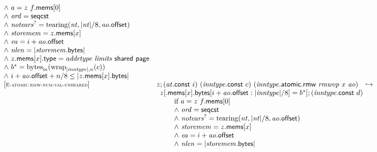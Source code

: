$$\begin{array}[t]{@{}lrcl@{}l@{}}
{\begin{array}[t]{@{}l@{}}
{\land}~ a = z~f{.}\mathsf{mems}{}[0] \\
{\land}~ {\mathit{ord}} = \mathsf{seqcst} \\
{\land}~ {{\mathit{notears}}^?} = {\mathrm{tearing}}({\mathit{nt}}, {|{\mathit{nt}}|} / 8, {\mathit{ao}}{.}\mathsf{offset}) \\
{\land}~ {\mathit{storemem}} = z{.}\mathsf{mems}{}[x] \\
{\land}~ {\mathit{ea}} = i + {\mathit{ao}}{.}\mathsf{offset} \\
{\land}~ {\mathit{nlen}} = {|{\mathit{storemem}}{.}\mathsf{bytes}|} \\
{\land}~ z{.}\mathsf{mems}{}[x]{.}\mathsf{type} = {\mathit{addrtype}}~{\mathit{limits}}~\mathsf{shared}~\mathsf{page} \\
{\land}~ {b^\ast} = {{\mathrm{bytes}}}_{{\mathsf{i}}{n}}({{\mathrm{wrap}}}_{{|{\mathit{inntype}}|}, n}(c)) \\
{\land}~ i + {\mathit{ao}}{.}\mathsf{offset} + n / 8 \leq {|z{.}\mathsf{mems}{}[x]{.}\mathsf{bytes}|} \\
\end{array}
} \\
{[\textsc{\scriptsize E{-}atomic.rmw{-}num{-}val{-}unshared}]} \quad & z ; ({\mathit{at}}{.}\mathsf{const}~i)~({\mathit{inntype}}{.}\mathsf{const}~c)~({\mathit{inntype}}{.}\mathsf{atomic}{.}\mathsf{rmw}~{\mathit{rmwop}}~x~{\mathit{ao}}) & \hookrightarrow & & \\
& \multicolumn{4}{@{}l@{}}{\quad
\begin{array}[t]{@{}l@{}l@{}l@{}}
z{}[{.}\mathsf{mems}{}[x]{.}\mathsf{bytes}{}[i + {\mathit{ao}}{.}\mathsf{offset} : {|{\mathit{inntype}}|} / 8] = {b^\ast}] ; ({\mathit{inntype}}{.}\mathsf{const}~d) & & \\
 \multicolumn{3}{@{}l@{}}{\quad
\begin{array}[t]{@{}l@{}}
\quad
\begin{array}[t]{@{}l@{}}
\mbox{if}~ a = z~f{.}\mathsf{mems}{}[0] \\
{\land}~ {\mathit{ord}} = \mathsf{seqcst} \\
{\land}~ {{\mathit{notears}}^?} = {\mathrm{tearing}}({\mathit{nt}}, {|{\mathit{nt}}|} / 8, {\mathit{ao}}{.}\mathsf{offset}) \\
{\land}~ {\mathit{storemem}} = z{.}\mathsf{mems}{}[x] \\
{\land}~ {\mathit{ea}} = i + {\mathit{ao}}{.}\mathsf{offset} \\
{\land}~ {\mathit{nlen}} = {|{\mathit{storemem}}{.}\mathsf{bytes}|} \\

\end{array}
\end{array}}
\end{array}}
\end{array}$$
